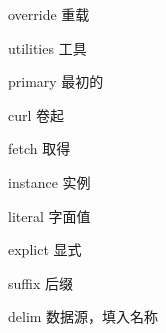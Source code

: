 override 重载

utilities 工具

primary 最初的

curl 卷起

fetch 取得

instance 实例

literal 字面值

explict 显式

suffix 后缀

delim 数据源，填入名称 